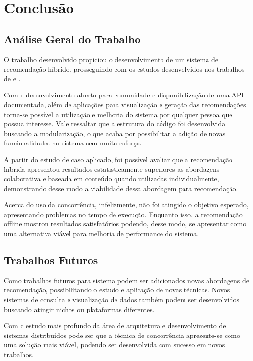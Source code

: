 \chapter{\textbf{Conclusão}} %

\section{Análise Geral do Trabalho}

O trabalho desenvolvido propiciou o desenvolvimento de um sistema de recomendação híbrido, prosseguindo com os estudos desenvolvidos nos trabalhos de  e .

Com o desenvolvimento aberto para comunidade e disponibilização de uma API documentada, além de aplicações para visualização e geração das recomendações torna-se possível a utilização e melhoria do sistema por qualquer pessoa que possua interesse. Vale ressaltar que a estrutura do código foi desenvolvida buscando a modularização, o que acaba por possibilitar a adição de novas funcionalidades no sistema sem muito esforço.

A partir do estudo de caso aplicado, foi possível avaliar que a recomendação híbrida apresentou resultados estatisticamente superiores as abordagens colaborativa e baseada em conteúdo quando utilizadas individualmente, demonstrando desse modo a viabilidade dessa abordagem para recomendação.

Acerca do uso da concorrência, infelizmente, não foi atingido o objetivo esperado, apresentando problemas no tempo de execução. Enquanto isso, a recomendação offline mostrou resultados satisfatórios podendo, desse modo, se apresentar como uma alternativa viável para melhoria de performance do sistema. 

\section{Trabalhos Futuros}

Como trabalhos futuros para sistema podem ser adicionados novas abordagens de recomendação, possibilitando o estudo e aplicação de novas técnicas. Novos sistemas de consulta e visualização de dados também podem ser desenvolvidos buscando atingir nichos ou plataformas diferentes.

Com o estudo mais profundo da área de arquitetura e desenvolvimento de sistemas distribuídos pode ser que a técnica de concorrência apresente-se como uma solução mais viável, podendo ser desenvolvida com sucesso em novos trabalhos.